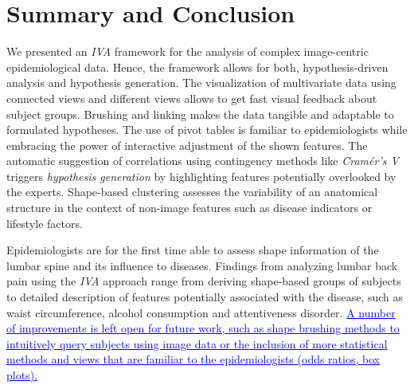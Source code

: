 \documentclass[journal]{style/vgtc} 			          %
\newcommand{\rem}[1]{\textcolor{red}{\sout{#1}}}
\newcommand{\add}[1]{\textcolor{blue}{\uline{#1}}}
\newcommand{\com}[1]{\textcolor{orange}{\uline{#1}}}
\begin{document}
\section{Summary and Conclusion}
We presented an \emph{IVA} framework for the analysis of complex image-centric epidemiological data.
%
Hence, the framework allows for both, hypothesis-driven analysis and hypothesis generation.
%
The visualization of multivariate data using connected views and different views allows to get fast visual feedback about subject groups.
%
Brushing and linking makes the data tangible and adaptable to formulated hypotheses.
%
The use of pivot tables is familiar to epidemiologists while embracing the power of interactive adjustment of the shown features.
%
The automatic suggestion of correlations using contingency methods like \emph{Cram\'{e}r's V} triggers \emph{hypothesis generation} by highlighting features potentially overlooked by the experts.
%
Shape-based clustering assesses the variability of an anatomical structure in the context of non-image features such as disease indicators or lifestyle factors.

Epidemiologists are for the first time able to assess shape information of the lumbar spine and its influence to diseases.
%
Findings from analyzing lumbar back pain using the \emph{IVA} approach range from deriving shape-based groups of subjects to detailed description of features potentially associated with the disease, such as waist circumference, alcohol consumption and attentiveness disorder.
%
%
\add{A number of improvements is left open for future work, such as shape brushing methods to intuitively query subjects using image data or the inclusion of more statistical methods and views that are familiar to the epidemiologists (odds ratios, box plots).}
\end{document}
